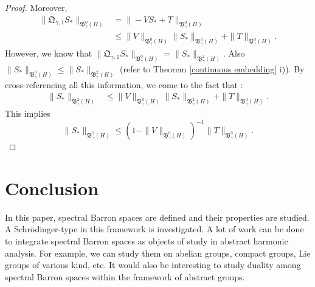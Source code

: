 \documentclass[11pt,a4paper]{amsart}
\begin{document}
\begin{proof}
Moreover,
\begin{align*}
\|\mathfrak{Q}_{\gamma,1}S_*\|_{\mathfrak{B}_\gamma^{0}(H)}&=\|-VS_*+T\|_{\mathfrak{B}_\gamma^{0}(H)}\\
&\leq \|V\|_{\mathfrak{B}_\gamma^{0}(H)}\|S_*\|_{\mathfrak{B}_\gamma^{0}(H)}+ \|T\|_{\mathfrak{B}_\gamma^{0}(H)}.
\end{align*} 
However, we know that $\|\mathfrak{Q}_{\gamma,1}S_*\|_{\mathfrak{B}_\gamma^{0}(H)}=\|S_*\|_{\mathfrak{B}_\gamma^{2}(H)}$. Also $\|S_*\|_{\mathfrak{B}_\gamma^{0}(H)}\leq \|S_*\|_{\mathfrak{B}_\gamma^{2}(H)}$ (refer to Theorem \ref{continuous embedding} i)).  By cross-referencing all this information, we come to the fact that :
\begin{align*}
\|S_*\|_{\mathfrak{B}_\gamma^{2}(H)}&\leq \|V\|_{\mathfrak{B}_\gamma^{0}(H)}\|S_*\|_{\mathfrak{B}_\gamma^{2}(H)}+ \|T\|_{\mathfrak{B}_\gamma^{0}(H)}.
\end{align*}
This  implies 
$$\|S_*\|_{\mathfrak{B}_\gamma^{2}(H)}\leq (1-\|V\|_{\mathfrak{B}_\gamma^{0}(H)})^{-1}\|T\|_{\mathfrak{B}_\gamma^{0}(H)}.$$
\end{proof}

\section{Conclusion}
In this paper, spectral Barron spaces are defined and  their properties are studied. A Schr\"odinger-type in this framework is investigated. 
A lot of work can be done to integrate spectral Barron spaces as objects of study in abstract harmonic analysis. For example, we can study them on abelian groups, compact groups, Lie groups of various kind, etc. It would also be interesting  to study  duality among spectral Barron spaces within the framework of abstract groups.
\end{document}
